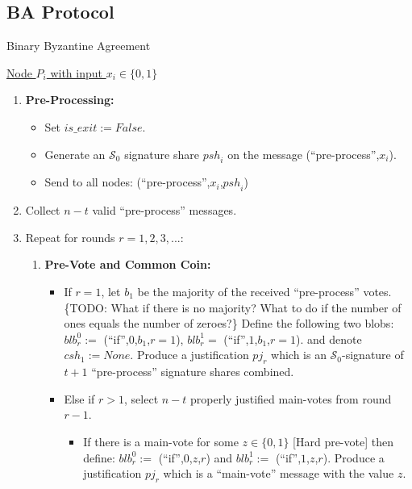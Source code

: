 \subsection{BA Protocol}

\begin{algorithm}
\caption{Binary Byzantine Agreement}
  \uline{Node $P_i$ with input $x_i \in \{0,1\}$}
  \begin{enumerate}

    \item \textbf{Pre-Processing:} 
      \begin{itemize}
        \item Set $is\_exit := False$. 
        \item Generate an $\mathcal{S}_0$ signature share ${psh}_i$ on the
          message (``pre-process'',$x_i$).
        \item Send to all nodes: (``pre-process'',$x_i$,${psh}_i$) 
      \end{itemize}
    \item \label{ba-collect-pre-process}
      Collect $n-t$ valid ``pre-process'' messages.
    \item Repeat for rounds $r=1,2,3,...$:
      \begin{enumerate}
        \item \textbf{Pre-Vote and Common Coin:} 
          \begin{itemize}
            \item If $r=1$, let $b_1$ be the majority of the received
              ``pre-process'' votes. \{TODO: What if there is no majority? What
              to do if the number of ones equals the number of zeroes?\}
              Define the following two blobs: ${blb}_r^0 :=$
              (``if'',$0$,$b_1$,$r=1$), ${blb}_r^1 =$ (``if'',$1$,$b_1$,$r=1$).
              and denote ${csh}_1 := None$. Produce a justification ${pj}_r$
              which is an $\mathcal{S}_0$-signature of $t+1$ ``pre-process''
              signature shares combined.

            \item Else if $r > 1$, select $n-t$ properly justified main-votes
              from round $r-1$. 
              \begin{itemize}
                \item If there is a main-vote for some $z \in \{0,1\}$ [Hard
                  pre-vote] then define: ${blb}_r^0 :=$
                  (``if'',$0$,$z$,$r$) and ${blb}_r^1 := $ (``if'',$1$,$z$,$r$).
                  Produce a justification ${pj}_r$ which is a ``main-vote''
                  message with the value $z$.


\end{itemize}
\end{itemize}
\end{enumerate}
\end{enumerate}
\end{algorithm}
